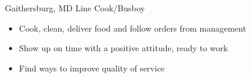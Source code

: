 
        {Gaithersburg, MD}
        {Line Cook/Busboy}
        {}{
    \begin{itemize}
        \item Cook, clean, deliver food and follow orders from management
        \item Show up on time with a positive attitude, ready to work
        \item Find ways to improve quality of service
    \end{itemize}
}
